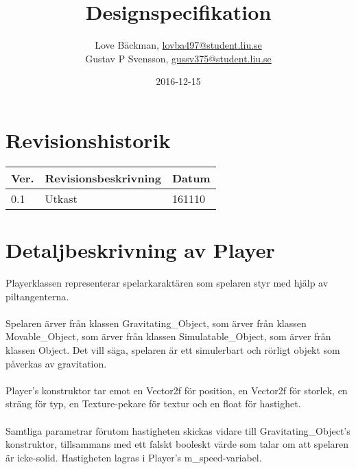 \documentclass{TDP003mall}
\author{Love Bäckman, \url{lovba497@student.liu.se} \\
    Gustav P Svensson, \url{gussv375@student.liu.se}}
\title{Designspecifikation}
\date{2016-12-15}
\begin{document}
\projectpage

\tableofcontents
\newpage

\section{Revisionshistorik}
\begin{table}[!h]
\begin{tabularx}{\linewidth}{|l|X|l|}
\hline
Ver. & Revisionsbeskrivning & Datum \\\hline
0.1 & Utkast & 161110 \\\hline
\end{tabularx}
\end{table}

\section{Detaljbeskrivning av Player}
Playerklassen representerar spelarkaraktären som spelaren styr med hjälp av piltangenterna.
\\\\
Spelaren ärver från klassen Gravitating\_Object, som ärver från klassen Movable\_Object, som ärver från klassen Simulatable\_Object, som ärver från klassen Object. Det vill säga, spelaren är ett simulerbart och rörligt objekt som påverkas av gravitation.
\\\\
Player's konstruktor tar emot en Vector2f för position, en Vector2f för storlek, en sträng för typ, en Texture-pekare för textur och en float för hastighet.
\\\\
Samtliga parametrar förutom hastigheten skickas vidare till Gravitating\_Object's konstruktor, tillsammans med ett falskt booleskt värde som talar om att spelaren är icke-solid. Hastigheten lagras i Player's m\_speed-variabel.
\end{document}
